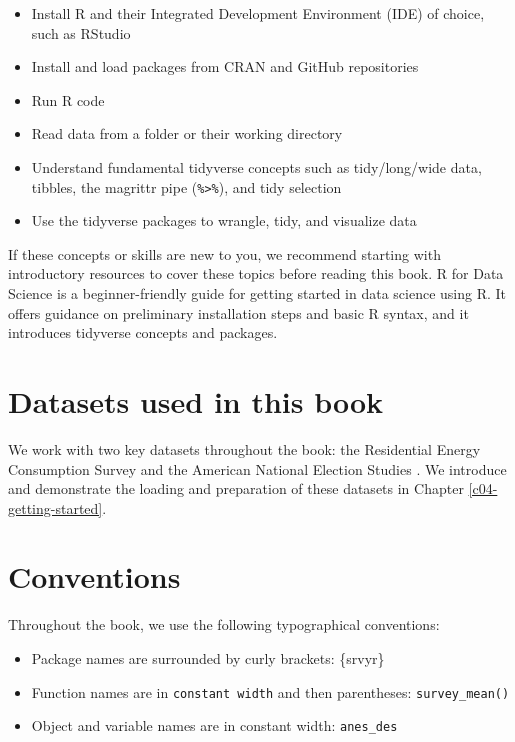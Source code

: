 \documentclass[
]{krantz}
\providecommand{\tightlist}{%
  \setlength{\itemsep}{0pt}\setlength{\parskip}{0pt}}
\begin{document}
\begin{itemize}
\tightlist
\item
  Install R and their Integrated Development Environment (IDE) of choice, such as RStudio
\item
  Install and load packages from CRAN and GitHub repositories
\item
  Run R code
\item
  Read data from a folder or their working directory
\item
  Understand fundamental tidyverse concepts such as tidy/long/wide data, tibbles, the magrittr pipe (\texttt{\%\textgreater{}\%}), and tidy selection
\item
  Use the tidyverse packages to wrangle, tidy, and visualize data
\end{itemize}

If these concepts or skills are new to you, we recommend starting with introductory resources to cover these topics before reading this book. R for Data Science \citep{wickham2023r4ds} is a beginner-friendly guide for getting started in data science using R. It offers guidance on preliminary installation steps and basic R syntax, and it introduces tidyverse concepts and packages.

\hypertarget{datasets-used-in-this-book}{%
\section{Datasets used in this book}\label{datasets-used-in-this-book}}

We work with two key datasets throughout the book: the Residential Energy Consumption Survey \citep[RECS --][]{recs-2020-tech} and the American National Election Studies \citep[ANES --][]{debell}. We introduce and demonstrate the loading and preparation of these datasets in Chapter \ref{c04-getting-started}.

\hypertarget{conventions}{%
\section{Conventions}\label{conventions}}

Throughout the book, we use the following typographical conventions:

\begin{itemize}
\tightlist
\item
  Package names are surrounded by curly brackets: \{srvyr\}
\item
  Function names are in \texttt{constant\ width} and then parentheses: \texttt{survey\_mean()}
\item
  Object and variable names are in constant width: \texttt{anes\_des}
\end{itemize}
\end{document}
